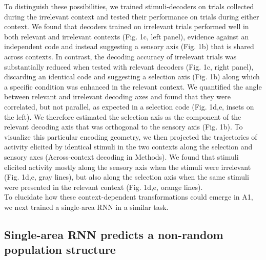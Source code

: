 \documentclass[12pt]{article}
\begin{document}
To distinguish these possibilities, we trained stimuli-decoders on trials collected during the irrelevant context and tested their performance on trials during either context. We found that decoders trained on irrelevant trials performed well in both relevant and irrelevant contexts (Fig. 1c, left panel), evidence against an independent code and instead suggesting a sensory axis (Fig. 1b) that is shared across contexts. In contrast, the decoding accuracy of irrelevant trials was substantially reduced when tested with relevant decoders (Fig. 1c, right panel), discarding an identical code and suggesting a selection axis (Fig. 1b) along which a specific condition was enhanced in the relevant context. We quantified the angle between relevant and irrelevant decoding axes and found that they were correlated, but not parallel, as expected in a selection code (Fig. 1d,e, insets on the left). We therefore estimated the selection axis as the component of the relevant decoding axis that was orthogonal to the sensory axis (Fig. 1b). To visualize this particular encoding geometry, we then projected the trajectories of activity elicited by identical stimuli in the two contexts along the selection and sensory axes  (Across-context decoding in Methods). We found that stimuli elicited activity mostly along the sensory axis when the stimuli were irrelevant (Fig. 1d,e, gray lines), but also along the selection axis when the same stimuli were presented in the relevant context (Fig. 1d,e, orange lines). \\
 
To elucidate how these context-dependent transformations could emerge in A1, we next trained a single-area RNN in a similar task. \\

\subsection*{Single-area RNN predicts a non-random population structure}
\end{document}
